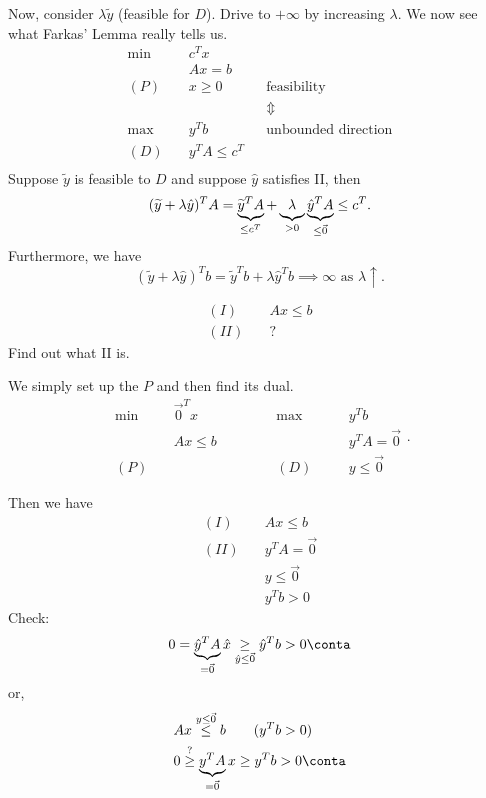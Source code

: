 \begin{remark}
	Now, consider \(\lambda \widetilde{y}\) (feasible for \(D\)). Drive to \(+\infty \) by increasing \(\lambda\). We now see what Farkas' Lemma really tells us.
	\begin{align*}
		\min~    & c^{T} x                                            \\
		         & Ax = b                                             \\
		(P)\quad & x\geq 0            &  & \text{feasibility}         \\
		         &                    &  & \Updownarrow               \\
		\max~    & y^{T}b             &  & \text{unbounded direction} \\
		(D)\quad & y^{T} A \leq c^{T}                                 \\
	\end{align*}
	Suppose \(\widetilde{y}\) is feasible to \(D\) and suppose \(\hat{y}\) satisfies II, then
	\[
		(\widetilde{y}+\lambda \hat{y})^{T} A = \underbrace{\widetilde{y}^{T}A}_{\leq c^{T}} + \underbrace{\vphantom{y}\lambda}_{>0} \underbrace{\hat{y}^{T} A}_{\leq \vec{0}} \leq c^{T}.
	\]
	Furthermore, we have
	\[
		(\widetilde{y}+\lambda \hat{y})^{T} b = \widetilde{y}^{T} b+\lambda \hat{y}^{T} b \implies \infty \text{ as } \lambda \uparrow  .
	\]
\end{remark}

\begin{eg}
	\begin{align*}
		(I)\quad  & Ax\leq b \\
		(II)\quad & ?
	\end{align*}
	Find out what II is.

	We simply set up the \(P\) and then find its dual.
	\[
		\begin{alignedat}{5}
			\min~&\vec{0}^{T} x\qquad\qquad	&&\max ~&&y^{T}b\\
			&Ax \leq b 			&&			&&y^{T} A =\vec{0}\\
			(P)\quad&			&&(D)\quad	&&y\leq \vec{0}
		\end{alignedat}.
	\]

	Then we have
	\begin{align*}
		(I)\quad  & Ax\leq b         \\
		(II)\quad & y^{T}A = \vec{0} \\
		          & y\leq \vec{0}    \\
		          & y^{T} b>0
	\end{align*}
	Check\(\colon\)
	\[
		0 = \underbrace{\hat{y}^{T} A}_{=\vec{0}} \hat{x} \underset{\hat{y} \leq \vec{0}}{\geq}  \hat{y}^{T} b>0 \conta
	\]
	or,
	\[
		\begin{split}
			&Ax \overset{y\leq \vec{0}}{\leq} b\qquad (y^{T}b>0)\\
			&0 \overset{?}{\geq} \underbrace{y^{T}A}_{ = \vec{0}} x\geq y^{T}b>0\conta
		\end{split}
	\]
\end{eg}

